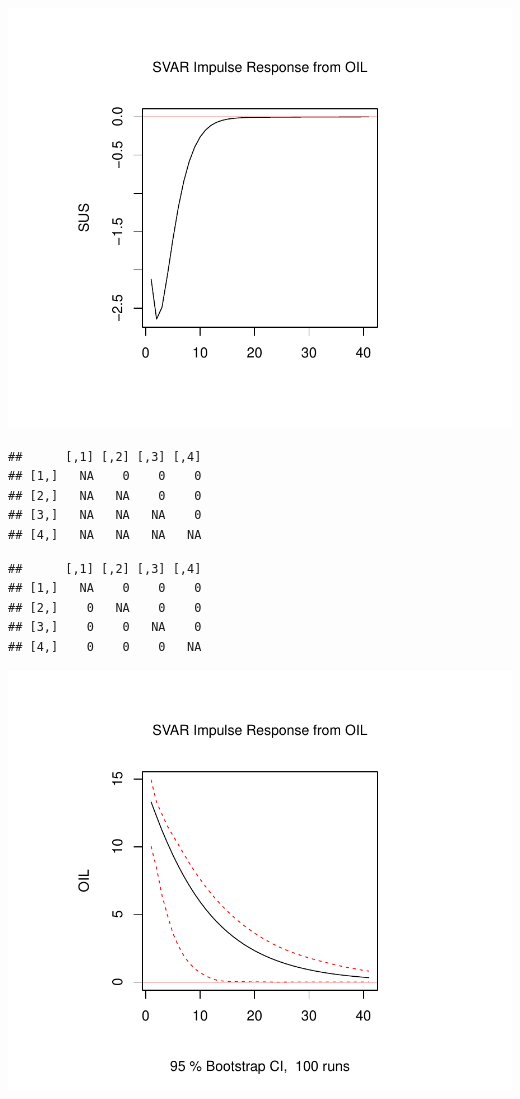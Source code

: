 \documentclass[11pt,preprint, authoryear]{elsarticle}
\numberwithin{equation}{section}
\numberwithin{figure}{section}
\numberwithin{table}{section}
\begin{document}
\includegraphics{replication_files/figure-latex/unnamed-chunk-8-2.pdf}

\begin{verbatim}
##      [,1] [,2] [,3] [,4]
## [1,]   NA    0    0    0
## [2,]   NA   NA    0    0
## [3,]   NA   NA   NA    0
## [4,]   NA   NA   NA   NA
\end{verbatim}

\begin{verbatim}
##      [,1] [,2] [,3] [,4]
## [1,]   NA    0    0    0
## [2,]    0   NA    0    0
## [3,]    0    0   NA    0
## [4,]    0    0    0   NA
\end{verbatim}

\includegraphics{replication_files/figure-latex/unnamed-chunk-8-3.pdf}
\end{document}
